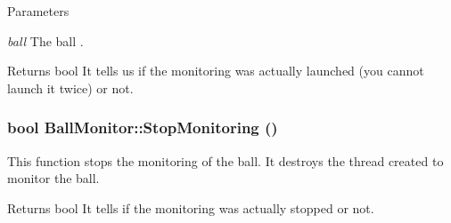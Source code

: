 \begin{DoxyParams}{Parameters}
\item[{\em ball}]The ball . \end{DoxyParams}
\begin{DoxyReturn}{Returns}
bool It tells us if the monitoring was actually launched (you cannot launch it twice) or not. 
\end{DoxyReturn}
\hypertarget{classBallMonitor_af71db12abeb1f10f7be58eb7591910a3}{
\subsubsection[{StopMonitoring}]{\setlength{\rightskip}{0pt plus 5cm}bool BallMonitor::StopMonitoring ()}}
\label{classBallMonitor_af71db12abeb1f10f7be58eb7591910a3}


This function stops the monitoring of the ball. It destroys the thread created to monitor the ball. 

\begin{DoxyReturn}{Returns}
bool It tells if the monitoring was actually stopped or not. 
\end{DoxyReturn}


